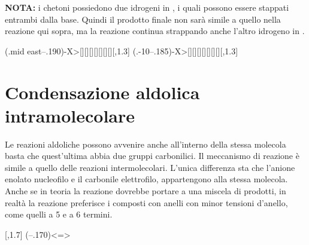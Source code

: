 \textbf{NOTA:} i chetoni possiedono due idrogeni in \a, i quali possono essere stappati entrambi dalla base. Quindi il prodotto finale non sarà simile a quello nella reazione qui sopra, ma la reazione continua strappando anche l'altro idrogeno in \a.

{\scriptsize
\begin{reaction}
	\arrow(.mid east--.190){-X>[][][][][][][]}[,1.3]
	\arrow(.-10--.185){-X>[][][][][][][]}[,1.3]
\end{reaction}
}


\section{Condensazione aldolica intramolecolare}
Le reazioni aldoliche possono avvenire anche all'interno della stessa molecola basta che quest'ultima abbia due gruppi carbonilici. Il meccanismo di reazione è simile a quello delle reazioni intermolecolari. L'unica differenza sta che l'anione enolato nucleofilo e il carbonile elettrofilo, appartengono alla stessa molecola. Anche se in teoria la reazione dovrebbe portare a una miscela di prodotti, in realtà la reazione preferisce i composti con anelli con minor tensioni d'anello, come quelli a 5 e a 6 termini.

\begin{reaction}
	\arrow{<=>[\ch{NaOH}, \ch{H2O}]}[,1.7]
	\arrow(--.170){<=>}
\end{reaction}